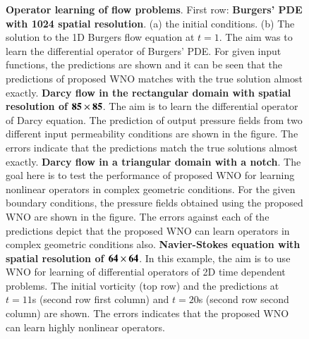 \documentclass{article}
\begin{document}
\begin{figure}[ht!]
	\caption{\textbf{Operator learning of flow problems}. First row: \textbf{Burgers' PDE with 1024 spatial resolution}. (a) the initial conditions. (b) The solution to the 1D Burgers flow equation at $t=1$. The aim was to learn the differential operator of Burgers' PDE. For given input functions, the predictions are shown and it can be seen that the predictions of proposed WNO matches with the true solution almost exactly. \textbf{Darcy flow in the rectangular domain with spatial resolution of ${\bf{85 \times 85}}$}. The aim is to learn the differential operator of Darcy equation. The prediction of output pressure fields from two different input permeability conditions are shown in the figure. The errors indicate that the predictions match the true solutions almost exactly. \textbf{Darcy flow in a triangular domain with a notch}. The goal here is to test the performance of proposed WNO for learning nonlinear operators in complex geometric conditions. For the given boundary conditions, the pressure fields obtained using the proposed WNO are shown in the figure. The errors against each of the predictions depict that the proposed WNO can learn operators in complex geometric conditions also. \textbf{Navier-Stokes equation with spatial resolution of ${\bf{64 \times 64}}$}. In this example, the aim is to use WNO for learning of differential operators of 2D time dependent problems. The initial vorticity (top row) and the predictions at $t=11$s (second row first column) and $t=20$s (second row second column) are shown. The errors indicates that the proposed WNO can learn highly nonlinear operators.}
	\label{fig_result1}
\end{figure}
\end{document}
